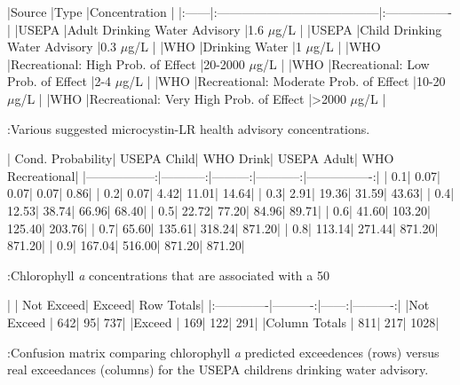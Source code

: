 |Source |Type                                    |Concentration    |
|:------|:---------------------------------------|:----------------|
|USEPA  |Adult Drinking Water Advisory           |1.6 $\mu$g/L     |
|USEPA  |Child Drinking Water Advisory           |0.3 $\mu$g/L     |
|WHO    |Drinking Water                          |1 $\mu$g/L       |
|WHO    |Recreational: High Prob. of Effect      |20-2000 $\mu$g/L |
|WHO    |Recreational: Low Prob. of Effect       |2-4 $\mu$g/L     |
|WHO    |Recreational: Moderate Prob. of Effect  |10-20 $\mu$g/L   |
|WHO    |Recreational: Very High Prob. of Effect |>2000 $\mu$g/L   |



:Various suggested microcystin-LR health advisory concentrations. \label{tab:microcystin_levels}

\newpage


| Cond. Probability| USEPA Child| WHO Drink| USEPA Adult| WHO Recreational|
|-----------------:|-----------:|---------:|-----------:|----------------:|
|               0.1|        0.07|      0.07|        0.07|             0.86|
|               0.2|        0.07|      4.42|       11.01|            14.64|
|               0.3|        2.91|     19.36|       31.59|            43.63|
|               0.4|       12.53|     38.74|       66.96|            68.40|
|               0.5|       22.72|     77.20|       84.96|            89.71|
|               0.6|       41.60|    103.20|      125.40|           203.76|
|               0.7|       65.60|    135.61|      318.24|           871.20|
|               0.8|      113.14|    271.44|      871.20|           871.20|
|               0.9|      167.04|    516.00|      871.20|           871.20|



:Chlorophyll \textit{a} concentrations that are associated with a 50%

\newpage


|              | Not Exceed| Exceed| Row Totals|
|:-------------|----------:|------:|----------:|
|Not Exceed    |        642|     95|        737|
|Exceed        |        169|    122|        291|
|Column Totals |        811|    217|       1028|



:Confusion matrix comparing chlorophyll \textit{a} predicted exceedences (rows) versus real exceedances (columns) for the USEPA childrens drinking water advisory. \label{tab:child_conmat_table}

